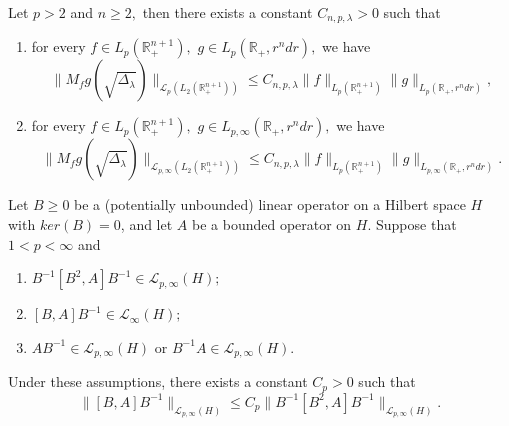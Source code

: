 \documentclass[12pt]{amsart}
\begin{document}
\begin{theorem}\label{cwikel estimate in bessel setting}
Let $p>2$ and $n\geq 2,$ then there exists a constant $C_{n,p,\lambda}>0$ such that
\begin{enumerate}[{\rm (i)}]
\item for every $f\in L_p(\mathbb{R}_+^{n+1}),$ $g\in L_p(\mathbb{R}_+,r^ndr),$  we have
$$\|M_fg(\sqrt{\Delta_{\lambda}})\|_{\mathcal{L}_p(L_2(\mathbb{R}_+^{n+1}))}\leq C_{n,p,\lambda}\|f\|_{L_p(\mathbb{R}_+^{n+1})}\|g\|_{L_{p}(\mathbb{R}_+,r^ndr)},$$
\item for every $f\in L_p(\mathbb{R}_+^{n+1}),$ $g\in L_{p,\infty}(\mathbb{R}_+,r^ndr),$ we have
$$\|M_fg(\sqrt{\Delta_{\lambda}})\|_{\mathcal{L}_{p,\infty}(L_2(\mathbb{R}_+^{n+1}))}\leq C_{n,p,\lambda}\|f\|_{L_p(\mathbb{R}_+^{n+1})}\|g\|_{L_{p,\infty}(\mathbb{R}_+,r^ndr)}.$$
\end{enumerate}
\end{theorem}


%

\begin{lemma}\cite[Lemma 4.4]{MR4654013}\label{surprisingly_technical_lemma}
Let $B\geq 0$ be a (potentially unbounded) linear operator on a Hilbert space $H$ with $ker(B)=0$, and let $A$ be a bounded operator on $H$. Suppose that $1<p<\infty$ and
\begin{enumerate}[{\rm (i)}]
\item $B^{-1}[B^2,A]B^{-1}\in\mathcal{L}_{p,\infty}(H);$
\item $[B,A]B^{-1}\in\mathcal{L}_{\infty}(H);$
\item $AB^{-1}\in\mathcal{L}_{p,\infty}(H)$ or $B^{-1}A\in\mathcal{L}_{p,\infty}(H).$
\end{enumerate}
Under these assumptions, there exists a constant $C_p>0$ such that
$$\|[B,A]B^{-1}\|_{\mathcal{L}_{p,\infty}(H)} \leq C_p\|B^{-1}[B^2,A]B^{-1}\|_{\mathcal{L}_{p,\infty}(H)}.$$
\end{lemma}
\end{document}
